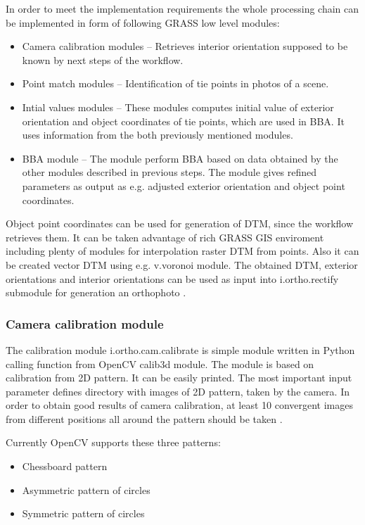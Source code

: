 \documentclass[a4paper,12pt]{article}
\begin{document}
In order to meet the implementation requirements the whole processing chain can be implemented in form
of following GRASS low level modules:

\begin{itemize}
\item Camera calibration modules -- Retrieves interior orientation supposed to be known by 
next steps of the workflow.
\item Point match modules -- Identification of tie points in photos of a scene.
\item Intial values modules -- These modules computes initial value of exterior orientation and 
object coordinates of tie points, which are used in BBA. It uses information from the both
previously mentioned modules.
\item BBA module -- The module perform BBA based on data obtained by the other modules described in previous steps.
The module gives refined parameters as output as e.g. adjusted exterior orientation and object point coordinates.   
\end{itemize}

Object point coordinates can be used for generation of DTM, since the workflow retrieves them. 
It can be taken advantage of rich GRASS GIS  enviroment
including plenty of modules for interpolation raster DTM from points. Also it can be 
created vector DTM using e.g. v.voronoi module. 
The obtained DTM, exterior orientations and interior orientations
can be used as input into i.ortho.rectify submodule for generation an orthophoto . 

\subsubsection{Camera calibration module}

The calibration module i.ortho.cam.calibrate is simple module written in Python calling
function from OpenCV calib3d module. The module is based on cali\-bration from 2D pattern.
It can be easily printed. 
The most important input parameter defines directory with images of 2D pattern, 
taken by the camera. In order to obtain good results of camera calibration, at least 10 convergent images 
from different positions all around the pattern should be taken \cite{camera_calibration2013opencv}.

Currently OpenCV supports these three patterns:
\begin{itemize}
\item Chessboard pattern 
\item Asymmetric pattern of circles
\item Symmetric pattern of circles
\end{itemize}
\end{document}
